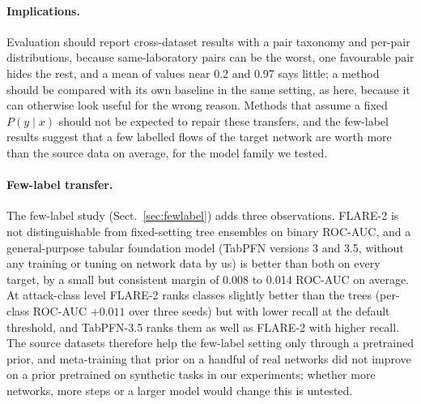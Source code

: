 \documentclass[11pt]{article}
\begin{document}
\paragraph{Implications.}
Evaluation should report cross-dataset results with a pair taxonomy and per-pair distributions, because same-laboratory pairs can be the worst, one favourable pair hides the rest, and a mean of values near 0.2 and 0.97 says little; a method should be compared with its own baseline in the same setting, as here, because it can otherwise look useful for the wrong reason.
Methods that assume a fixed $P(y\mid x)$ should not be expected to repair these transfers, and the few-label results suggest that a few labelled flows of the target network are worth more than the source data on average, for the model family we tested.

\paragraph{Few-label transfer.}
The few-label study (Sect.~\ref{sec:fewlabel}) adds three observations.
FLARE-2 is not distinguishable from fixed-setting tree ensembles on binary ROC-AUC, and a general-purpose tabular foundation model (TabPFN versions 3 and 3.5, without any training or tuning on network data by us) is better than both on every target, by a small but consistent margin of 0.008 to 0.014 ROC-AUC on average.
At attack-class level FLARE-2 ranks classes slightly better than the trees (per-class ROC-AUC $+0.011$ over three seeds) but with lower recall at the default threshold, and TabPFN-3.5 ranks them as well as FLARE-2 with higher recall.
The source datasets therefore help the few-label setting only through a pretrained prior, and meta-training that prior on a handful of real networks did not improve on a prior pretrained on synthetic tasks in our experiments; whether more networks, more steps or a larger model would change this is untested.
\end{document}
